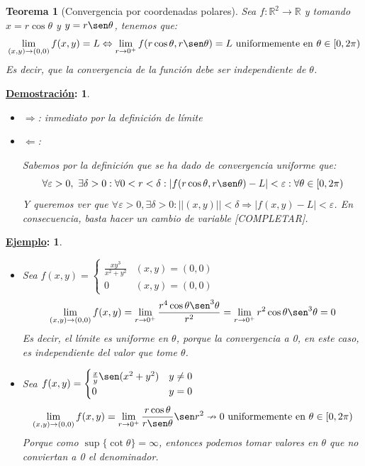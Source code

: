 \documentclass[10pt,a4paper,openright]{book}
\theoremstyle{break}
\newtheorem*{theo}{Teorema}
\newtheorem*{demo}{\underline{Demostración}:}
\newtheorem*{ej}{\underline{Ejemplo}:}
\begin{document}
\begin{theo}[Convergencia por coordenadas polares]
Sea $f: \mathbb{R}^2 \to \mathbb{R}$ y tomando $x=r\cos\theta$ y $y=r \sen\theta$, tenemos que:
$$\lim_{(x,y) \to (0,0)} f(x,y) = L \Leftrightarrow \lim_{r \to 0^+} f(r \cos\theta,r \sen\theta) = L \mbox{ uniformemente en } \theta \in [0, 2\pi)$$
Es decir, que la convergencia de la función debe ser independiente de $\theta$.
\end{theo}

\begin{demo}
\begin{itemize}
\item $\Rightarrow$: inmediato por la definición de límite
\item $\Leftarrow$:

Sabemos por la definición que se ha dado de convergencia uniforme que:
$$\forall \varepsilon > 0 ,\ \exists \delta > 0 :  \forall 0 < r < \delta: |f(r \cos\theta,r \sen\theta) - L| < \varepsilon : \forall \theta \in [0,2\pi)$$
Y queremos ver que $\forall \varepsilon > 0, \exists \delta > 0 : ||(x,y)|| < \delta \Rightarrow |f(x,y) - L| < \varepsilon$. En consecuencia, basta hacer un cambio de variable [COMPLETAR].
\end{itemize}
\end{demo}

\begin{ej}
\begin{itemize}
\item Sea $f(x,y)= \begin{cases} \frac{xy^3}{x^2  + y^2} & (x,y) = (0,0) \\ 0 & (x,y) = (0,0) \end{cases}$
$$\lim_{(x,y) \to (0,0)} f(x,y) = \lim_{r \to 0^+} \frac{r^4 \cos\theta \sen^3 \theta}{r^2} = \lim_{r \to 0^+} r^2 \cos\theta \sen^3 \theta = 0$$
Es decir, el límite es uniforme en $\theta$, porque la convergencia a 0, en este caso, es independiente del valor que tome $\theta$.
\item Sea $f(x,y) = \begin{cases} \frac{x}{y} \sen (x^2 + y^2) & y \neq 0 \\ 0 & y = 0 \end{cases}$
$$\lim_{(x,y) \to (0,0)} f(x,y) = \lim_{r \to 0^+} \frac{r \cos\theta}{r \sen\theta} \sen r^2 \nrightarrow 0 \mbox{ uniformemente en } \theta \in [0,2\pi)$$
Porque como $\sup \{\cot \theta\} = \infty$, entonces podemos tomar valores en $\theta$ que no conviertan a 0 el denominador.
\end{itemize}
\end{ej}
\end{document}

